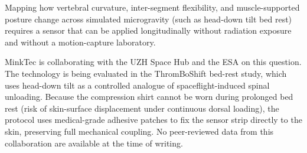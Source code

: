 Mapping how vertebral curvature, inter-segment flexibility, and muscle-supported
posture change across simulated microgravity (such as head-down tilt bed rest) requires
a sensor that can be applied longitudinally without radiation exposure and without a
motion-capture laboratory.

MinkTec is collaborating with the UZH Space Hub and the \ac{ESA} on this question.
The technology is being evaluated in the ThromBoShift bed-rest study, which uses
head-down tilt as a controlled analogue of spaceflight-induced spinal unloading.
Because the compression shirt cannot be worn during prolonged bed rest (risk of
skin-surface displacement under continuous dorsal loading), the protocol uses
medical-grade adhesive patches to fix the sensor strip directly to the skin,
preserving full mechanical coupling.
No peer-reviewed data from this collaboration are available at the time of writing.
